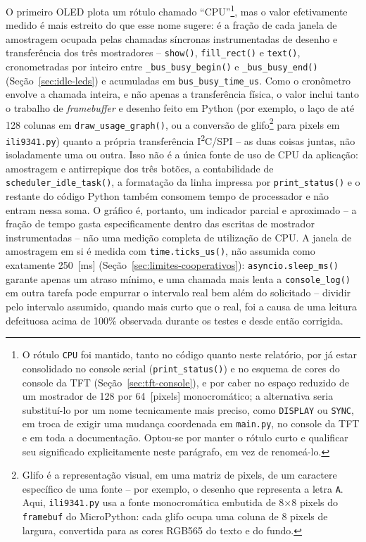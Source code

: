 \documentclass[12pt,a4paper]{article}
\begin{document}
O primeiro OLED plota um rótulo chamado \enquote{CPU}\footnote{O rótulo \texttt{CPU} foi mantido, tanto no código quanto neste relatório, por já estar consolidado no console serial (\texttt{print\_status()}) e no esquema de cores do console da TFT (Seção~\ref{sec:tft-console}), e por caber no espaço reduzido de um mostrador de 128 por 64~[pixels] monocromático; a alternativa seria substituí-lo por um nome tecnicamente mais preciso, como \texttt{DISPLAY} ou \texttt{SYNC}, em troca de exigir uma mudança coordenada em \texttt{main.py}, no console da TFT e em toda a documentação. Optou-se por manter o rótulo curto e qualificar seu significado explicitamente neste parágrafo, em vez de renomeá-lo.}, mas o valor efetivamente medido é mais estreito do que esse nome sugere: é a fração de cada janela de amostragem ocupada pelas chamadas síncronas instrumentadas de desenho e transferência dos três mostradores -- \texttt{show()}, \texttt{fill\_rect()} e \texttt{text()}, cronometradas por inteiro entre \texttt{\_bus\_busy\_begin()} e \texttt{\_bus\_busy\_end()} (Seção~\ref{sec:idle-leds}) e acumuladas em \texttt{bus\_busy\_time\_us}. Como o cronômetro envolve a chamada inteira, e não apenas a transferência física, o valor inclui tanto o trabalho de \textit{framebuffer} e desenho feito em Python (por exemplo, o laço de até 128 colunas em \texttt{draw\_usage\_graph()}, ou a conversão de glifo\footnote{Glifo é a representação visual, em uma matriz de pixels, de um caractere específico de uma fonte -- por exemplo, o desenho que representa a letra \texttt{A}. Aqui, \texttt{ili9341.py} usa a fonte monocromática embutida de 8×8 pixels do \texttt{framebuf} do MicroPython: cada glifo ocupa uma coluna de 8 pixels de largura, convertida para as cores RGB565 do texto e do fundo.} para pixels em \texttt{ili9341.py}) quanto a própria transferência I\textsuperscript{2}C/SPI -- as duas coisas juntas, não isoladamente uma ou outra. Isso não é a única fonte de uso de CPU da aplicação: amostragem e antirrepique dos três botões, a contabilidade de \texttt{scheduler\_idle\_task()}, a formatação da linha impressa por \texttt{print\_status()} e o restante do código Python também consomem tempo de processador e não entram nessa soma. O gráfico é, portanto, um indicador parcial e aproximado -- a fração de tempo gasta especificamente dentro das escritas de mostrador instrumentadas -- não uma medição completa de utilização de CPU. A janela de amostragem em si é medida com \texttt{time.ticks\_us()}, não assumida como exatamente 250~[ms] (Seção~\ref{sec:limites-cooperativos}): \texttt{asyncio.sleep\_ms()} garante apenas um atraso mínimo, e uma chamada mais lenta a \texttt{console\_log()} em outra tarefa pode empurrar o intervalo real bem além do solicitado -- dividir pelo intervalo assumido, quando mais curto que o real, foi a causa de uma leitura defeituosa acima de 100\% observada durante os testes e desde então corrigida.
\end{document}
